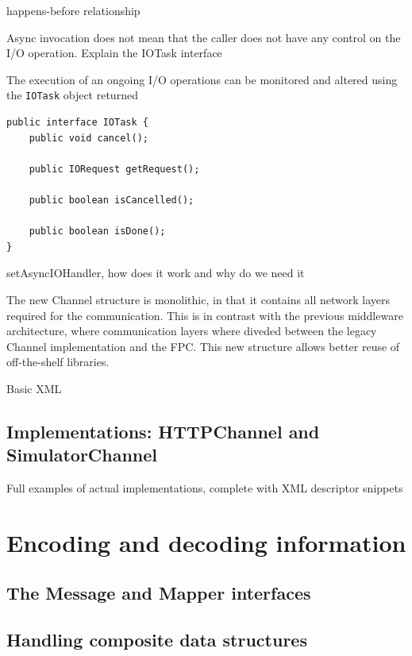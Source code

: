 happens-before relationship

Async invocation does not mean that the caller does not have any control on the I/O operation. Explain the IOTask interface


The execution of an ongoing I/O operations can be monitored and altered using the \texttt{IOTask} object returned 



\lstset{language=Java}
\begin{lstlisting}[float,floatplacement=H,caption=The IOTask interface,label={lst:iotask}]
public interface IOTask {
	public void cancel();
	
	public IORequest getRequest();
	
	public boolean isCancelled();
	
	public boolean isDone();
}
\end{lstlisting}



setAsyncIOHandler, how does it work and why do we need it



The new Channel structure is monolithic, in that it contains all network layers required for the communication. This is in contrast with the previous middleware architecture, where communication layers where diveded between the legacy Channel implementation and the FPC. This new structure allows better reuse of off-the-shelf libraries.

Basic XML 


\subsection{Implementations: HTTPChannel and SimulatorChannel}
\label{sec:channel.implementations}

Full examples of actual implementations, complete with XML descriptor snippets


\section{Encoding and decoding information}
\label{sec:components.mapper}

\subsection{The Message and Mapper interfaces}

\subsection{Handling composite data structures}

